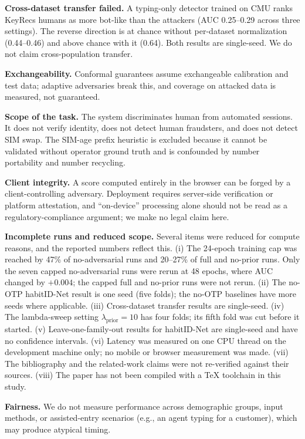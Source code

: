 \documentclass[conference]{IEEEtran}
\begin{document}
\textbf{Cross-dataset transfer failed.} A typing-only detector trained on CMU ranks KeyRecs humans as more bot-like than the attackers (AUC 0.25--0.29 across three settings). The reverse direction is at chance without per-dataset normalization (0.44--0.46) and above chance with it (0.64). Both results are single-seed. We do not claim cross-population transfer.

\textbf{Exchangeability.} Conformal guarantees assume exchangeable calibration and test data; adaptive adversaries break this, and coverage on attacked data is measured, not guaranteed.

\textbf{Scope of the task.} The system discriminates human from automated sessions. It does not verify identity, does not detect human fraudsters, and does not detect SIM swap. The SIM-age prefix heuristic is excluded because it cannot be validated without operator ground truth and is confounded by number portability and number recycling.

\textbf{Client integrity.} A score computed entirely in the browser can be forged by a client-controlling adversary. Deployment requires server-side verification or platform attestation, and ``on-device'' processing alone should not be read as a regulatory-compliance argument; we make no legal claim here.

\textbf{Incomplete runs and reduced scope.} Several items were reduced for compute reasons, and the reported numbers reflect this. (i) The 24-epoch training cap was reached by 47\% of no-adversarial runs and 20--27\% of full and no-prior runs. Only the seven capped no-adversarial runs were rerun at 48 epochs, where AUC changed by $+0.004$; the capped full and no-prior runs were not rerun. (ii) The no-OTP habitID-Net result is one seed (five folds); the no-OTP baselines have more seeds where applicable. (iii) Cross-dataset transfer results are single-seed. (iv) The lambda-sweep setting $\lambda_{\text{prior}}=10$ has four folds; its fifth fold was cut before it started. (v) Leave-one-family-out results for habitID-Net are single-seed and have no confidence intervals. (vi) Latency was measured on one CPU thread on the development machine only; no mobile or browser measurement was made. (vii) The bibliography and the related-work claims were not re-verified against their sources. (viii) The paper has not been compiled with a TeX toolchain in this study.

\textbf{Fairness.} We do not measure performance across demographic groups, input methods, or assisted-entry scenarios (e.g., an agent typing for a customer), which may produce atypical timing.
\end{document}
